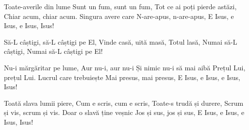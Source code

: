 \beginverse
Toate-averile din lume
Sunt un fum, sunt un fum,
Tot ce ai poți pierde astăzi,
Chiar acum, chiar acum.
Singura avere care
N-are-apus, n-are-apus,
E Isus, e Isus, e Isus, Isus!
\endverse

\beginchorus
Să-L câștigi, să-L câștigi pe El,
Vinde casă, uită masă,
Totul lasă,
Numai să-L câștigi,
Numai să-L câștigi pe El!
\endchorus

\beginverse
Nu-i mărgăritar pe lume,
Aur nu-i, aur nu-i
Și nimic nu-i să mai aibă
Prețul Lui, prețul Lui.
Lucrul care trebuiește
Mai presus, mai presus,
E Isus, e Isus, e Isus, Isus!
\endverse

\beginverse
Toată slava lumii piere,
Cum e scris, cum e scris,
Toate-s trudă și durere,
Scrum și vis, scrum și vis.
Doar o slavă ține veșnic
Jos și sus, jos și sus,
E Isus, e Isus, e Isus, Isus!
\endverse
\endsong